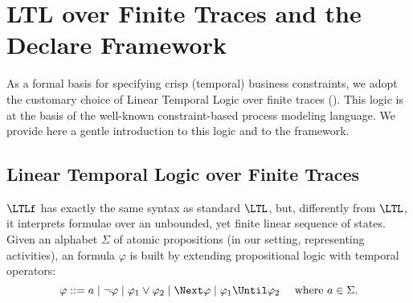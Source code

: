 \newcommand{\length}{\mathit{length}}
\newcommand{\true}{\mathit{true}}
\newcommand{\false}{\mathit{false}}
\newcommand{\aut}{\mathcal{A}}
\newcommand{\tasks}{\Sigma}
\newcommand{\trace}{\tau}

\newcommand{\close}{\activity{close}}
\newcommand{\accept}{\activity{accept}}
\newcommand{\reject}{\activity{reject}}

\section{LTL over Finite Traces and the Declare Framework}
\label{sec:preliminaries}
As a formal basis for specifying crisp (temporal) business constraints, we adopt the customary choice of Linear Temporal Logic over finite traces (\LTLf \cite{DeVa13,DDGM14}). This logic is at the basis of the well-known \declare \cite{PeSV07} constraint-based process modeling language.
We provide here a gentle introduction to this logic and to the \declare framework.

\subsection{Linear Temporal Logic over Finite Traces}

$\LTLf$ has exactly the same syntax as standard $\LTL$, but, differently from $\LTL$, it interprets formulae over an unbounded, yet finite linear sequence of states. Given an alphabet $\Sigma$ of atomic propositions (in our setting, representing activities), an \LTLf formula $\varphi$ is built by extending propositional logic with temporal operators:
\[\varphi ::= a \mid \lnot \varphi \mid \varphi_1\lor \varphi_2
 \mid \Next\varphi \mid \varphi_1\Until\varphi_2 \quad \text{ where $a \in \Sigma$.}\]





